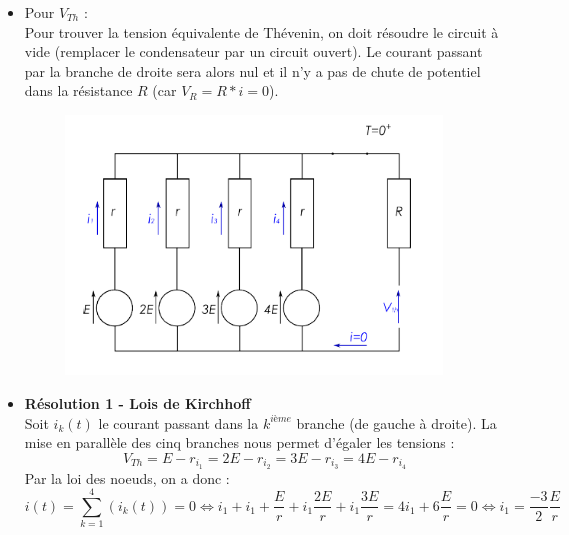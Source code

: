 \begin{itemize}
{\begin{itemize}
\begin{figure}[h!!!]
            \label{fig:Q3_TheoCircuitsJanv2014_Reso1}
        \end{figure}
        \item Pour $V_{Th}$ :\\
        Pour trouver la tension équivalente de Thévenin, on doit résoudre le circuit à vide (remplacer le condensateur par un circuit ouvert). Le courant passant par la branche de droite sera alors nul et il n'y a pas de chute de potentiel dans la résistance $R$ (car $V_R = R*i = 0$).
        \begin{figure}[h!!!!]
            \centering
            \includegraphics[width = 10cm]{TpQEx_Circuits/TP11Q2_Reso2.PNG}
            \label{fig:Q3_TheoCircuitsJanv2014_Reso2}
        \end{figure}
        \item \textbf{Résolution 1 - Lois de Kirchhoff}\\
        Soit $i_k(t)$ le courant passant dans la $k^{ième}$ branche (de gauche à droite).
        La mise en parallèle des cinq branches nous permet d'égaler les tensions :
        \begin{equation*}
            V_{Th} = E - r_{i_1} = 2E - r_{i_2} = 3E - r_{i_3} = 4E - r_{i_4}
        \end{equation*}
        Par la loi des noeuds, on a donc :
        \begin{equation*}
            i(t) = \sum^4_{k=1}\left(i_k(t)\right) = 0
            
            \iff i_1+i_1+\dfrac{E}{r}+i_1\dfrac{2E}{r}+i_1\dfrac{3E}{r} = 4i_1+6\dfrac{E}{r} = 0
            
            \iff i_1 = \dfrac{-3}{2}\dfrac{E}{r}
            

\end{equation*}
\end{itemize}}
\end{itemize}
